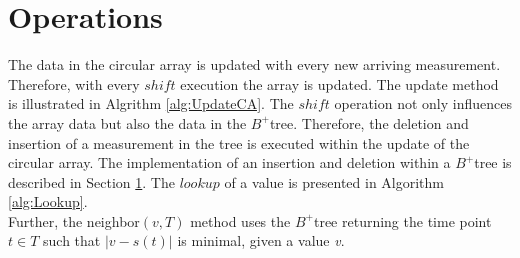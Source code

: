 \documentclass[abstracton,12pt]{scrreprt}
\begin{document}
\section{Operations}
\label{sec:OperationsOnBTree}
The data in the circular array is updated with every new arriving measurement. Therefore, with every $shift$ execution the array is updated. The update method is illustrated in Algrithm \ref{alg:UpdateCA}. The $shift$ operation not only influences the array data but also the data in the $B^+$tree. Therefore, the deletion and insertion of a measurement in the tree is executed within the update of the circular array. The implementation of an insertion and deletion within a $B^+$tree is described in Section \ref{sec:OperationsOnBTree}. The $lookup$ of a value is presented in Algorithm \ref{alg:Lookup}.
\\Further, the neighbor$(v,T)$ method uses the $B^+$tree returning the time point $t \in T$ such that $|v-s(t)|$ is minimal, given a value \emph{v}.
\end{document}
